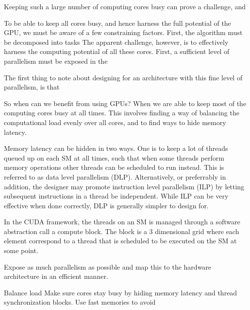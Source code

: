 \documentclass[12pt,journal,captionsoff,onecolumn]{IEEEtran}
\newcommand\1{\vec 1}
\begin{document}
Keeping such a large number of computing cores busy can prove a challenge, and 

To be able to keep all cores busy, and hence harness the full potential of the GPU, we must be aware of a few constraining factors. First, the algorithm must be decomposed into tasks
The apparent challenge, however, is to effectively harness the computing potential of all these cores. First, a sufficient level of parallelism must be exposed in the

The first thing to note about designing for an architecture with this fine level of parallelism, is that 

So when can we benefit from using GPUs? When we are able to keep most of the computing cores busy at all times. This involves finding a way of balancing the computational load evenly over all cores, and to find ways to hide memory latency. %

Memory latency can be hidden in two ways. One is to keep a lot of threads queued up on each SM at all times, such that when some threads perform memory operations other threads can be scheduled to run instead. This is referred to as data level parallelism (DLP). Alternatively, or preferrably in addition, the designer may promote instruction level parallelism (ILP) by letting subsequent instructions in a thread be independent. While ILP can be very effective when done correctly, DLP is generally simpler to design for.

In the CUDA framework, the threads on an SM is managed through a software abstraction call a compute block. The block is a 3 dimensional grid where each element correspond to a thread that is scheduled to be executed on the SM at some point.

Expose as much parallelism as possible and map this to the hardware architecture in an efficient manner. 

Balance load
Make sure cores stay busy by hiding memory latency and thread synchronization blocks. 
Use fast memories to avoid 

\end{document}
